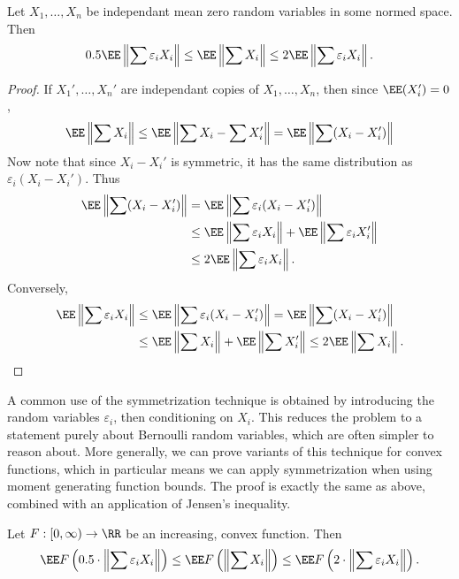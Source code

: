 \begin{lemma}
    Let $X_1, \dots, X_n$ be independant mean zero random variables in some normed space. Then
    \[ 0.5 \EE \left\| \sum \varepsilon_i X_i \right\| \leq \EE \left\| \sum X_i \right\| \leq 2 \EE \left\| \sum \varepsilon_i X_i \right\|. \]
\end{lemma}
\begin{proof}
    If $X_1', \dots, X_n'$ are independant copies of $X_1, \dots, X_n$, then since $\EE(X_i') = 0$,
    \[ \EE \left\| \sum X_i \right\| \leq \EE \left\| \sum X_i - \sum X_i' \right\| = \EE \left\| \sum (X_i - X_i') \right\| \]
    Now note that since $X_i - X_i'$ is symmetric, it has the same distribution as $\varepsilon_i(X_i - X_i')$. Thus
    \begin{align*}
        \EE \left\| \sum (X_i - X_i') \right\| &= \EE \left\| \sum \varepsilon_i(X_i - X_i') \right\|\\
        &\leq \EE \left\| \sum \varepsilon_i X_i \right\| + \EE \left\| \sum \varepsilon_i X_i' \right\|\\
        &\leq 2 \EE \left\| \sum \varepsilon_i X_i \right\|.
    \end{align*}
    Conversely,
    \begin{align*}
        \EE \left\| \sum \varepsilon_i X_i \right\| &\leq \EE \left\| \sum \varepsilon_i (X_i - X_i') \right\| = \EE \left\| \sum (X_i - X_i') \right\|\\
        &\leq \EE \left\| \sum X_i \right\| + \EE \left\| \sum X_i' \right\| \leq 2 \EE \left\| \sum X_i \right\|. \qedhere
    \end{align*}
\end{proof}

A common use of the symmetrization technique is obtained by introducing the random variables $\varepsilon_i$, then conditioning on $X_i$. This reduces the problem to a statement purely about Bernoulli random variables, which are often simpler to reason about. More generally, we can prove variants of this technique for convex functions, which in particular means we can apply symmetrization when using moment generating function bounds. The proof is exactly the same as above, combined with an application of Jensen's inequality.

\begin{theorem}
    Let $F: [0,\infty) \to \RR$ be an increasing, convex function. Then
    \[ \EE F \left( 0.5 \cdot \left\| \sum \varepsilon_i X_i \right\| \right) \leq \EE F \left( \left\| \sum X_i \right\| \right) \leq \EE F \left( 2 \cdot \left\| \sum \varepsilon_i X_i \right\| \right). \]
\end{theorem}


